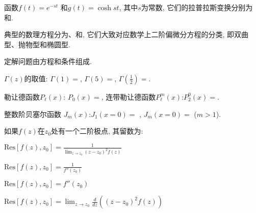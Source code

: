 \documentclass{njustexam}
\begin{document}
    \begin{problem}
    函数$f(t) = e^{-st}$ 和$g(t)=\cosh{st}$, 其中$s$为常数, 它们的拉普拉斯变换分别为 和.
    \end{problem}
    
    \begin{problem}
    典型的数理方程分为、和, 它们大致对应数学上二阶偏微分方程的分类, 即双曲型、抛物型和椭圆型. 
    \end{problem}
    
    \begin{problem}
    定解问题由方程和条件组成. 
    \end{problem}
    
    \begin{problem}
    $\Gamma(z)$的取值: $\Gamma(1)=$, $\Gamma(5)=$, $\Gamma(\frac{1}{2})= $\fillout{$\sqrt{\pi}$}.
    \end{problem}
    
    \begin{problem}
    勒让德函数$P_\ell(x)$:
    $P_0(x) = $, 连带勒让德函数$P_\ell^m(x)$:$P^0_2(x) = $. 
    \end{problem}
    
    \begin{problem}
    整数阶贝塞尔函数 $J_m(x)$:$J_1(x=0)=$ , $ J_m (x=0)=$ ($m>1$).
    \end{problem}
    
    


\begin{problem}
    如果$f(z)$在$z_0$处有一个二阶极点, 其留数为:
    \begin{abcd}
    \item $\text{Res}[f(z),  z_0] = \frac{1}{\lim_{z \to z_0} (z - z_0)^2 f(z)}$
    \item $\text{Res}[f(z),  z_0] = \frac{1}{f''(z_0)}$
    \item $\text{Res}[f(z),  z_0] = f''(z_0)$
    \item $\text{Res}[f(z),  z_0] = \lim_{z \to z_0} \frac{d}{dz} \left( (z - z_0)^2 f(z) \right)$
    \end{abcd}
    \end{problem}
    
\end{document}
